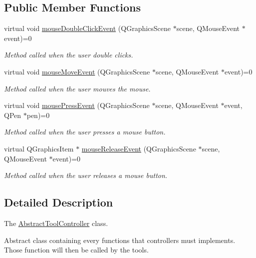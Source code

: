 \subsection*{Public Member Functions}
\begin{DoxyCompactItemize}
\item 
virtual void \hyperlink{classAbstractToolController_a9d509ed22a9826afec1df34b0885d0f8}{mouse\+Double\+Click\+Event} (Q\+Graphics\+Scene $\ast$scene, Q\+Mouse\+Event $\ast$event)=0
\begin{DoxyCompactList}\small\item\em Method called when the user double clicks. \end{DoxyCompactList}\item 
virtual void \hyperlink{classAbstractToolController_a0c48f932f791684ac1ae6570cd7ea7bd}{mouse\+Move\+Event} (Q\+Graphics\+Scene $\ast$scene, Q\+Mouse\+Event $\ast$event)=0
\begin{DoxyCompactList}\small\item\em Method called when the user mouves the mouse. \end{DoxyCompactList}\item 
virtual void \hyperlink{classAbstractToolController_ac48753f7a2864501760e66e67a369014}{mouse\+Press\+Event} (Q\+Graphics\+Scene $\ast$scene, Q\+Mouse\+Event $\ast$event, Q\+Pen $\ast$pen)=0
\begin{DoxyCompactList}\small\item\em Method called when the user presses a mouse button. \end{DoxyCompactList}\item 
virtual Q\+Graphics\+Item $\ast$ \hyperlink{classAbstractToolController_a8815614e51c7c47d3234f4ce3d8384ea}{mouse\+Release\+Event} (Q\+Graphics\+Scene $\ast$scene, Q\+Mouse\+Event $\ast$event)=0
\begin{DoxyCompactList}\small\item\em Method called when the user releases a mouse button. \end{DoxyCompactList}\end{DoxyCompactItemize}


\subsection{Detailed Description}
The \hyperlink{classAbstractToolController}{Abstract\+Tool\+Controller} class. 

Abstract class containing every functions that controllers must implements. Those function will then be called by the tools. 

